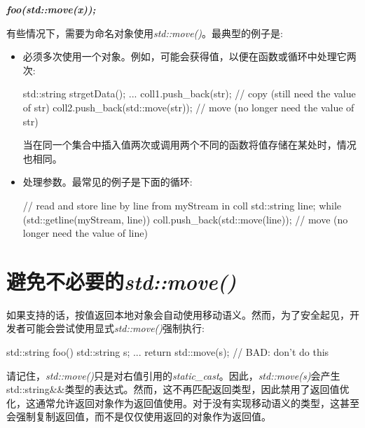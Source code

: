 \textit{\textbf{foo(\allowbreak{}std::\allowbreak{}move(\allowbreak{}x)\allowbreak{})\allowbreak{};}}\par


有些情况下，需要为命名对象使用\textit{std::move()}。最典型的例子是:\par

\begin{itemize}
  \item 必须多次使用一个对象。例如，可能会获得值，以便在函数或循环中处理它两次:\par
\begin{codebox}[cpp]
  std::string str{getData()};
  ...
  coll1.push_back(str); // copy (still need the value of str)
  coll2.push_back(std::move(str)); // move (no longer need the value of str)
\end{codebox}
  当在同一个集合中插入值两次或调用两个不同的函数将值存储在某处时，情况也相同。
  \item 处理参数。最常见的例子是下面的循环:\par
\begin{codebox}[cpp]
  // read and store line by line from myStream in coll
  std::string line;
  while (std::getline(myStream, line)) {
    coll.push_back(std::move(line)); // move (no longer need the value of line)
  }
\end{codebox}
\end{itemize}


\section{避免不必要的\textit{std::move()}}

如果支持的话，按值返回本地对象会自动使用移动语义。然而，为了安全起见，开发者可能会尝试使用显式\textit{std::move()}强制执行:\par

\begin{codebox}[cpp]
std::string foo()
{
  std::string s;
  ...
  return std::move(s); // BAD: don’t do this
}
\end{codebox}

请记住，\textit{std::move()}只是对右值引用的\textit{static\_\allowbreak{}cast}。因此，\textit{std::\allowbreak{}move(\allowbreak{}s)\allowbreak{}}会产生std::string\&\&类型的表达式。然而，这不再匹配返回类型，因此禁用了返回值优化，这通常允许返回对象作为返回值使用。对于没有实现移动语义的类型，这甚至会强制复制返回值，而不是仅仅使用返回的对象作为返回值。\par

